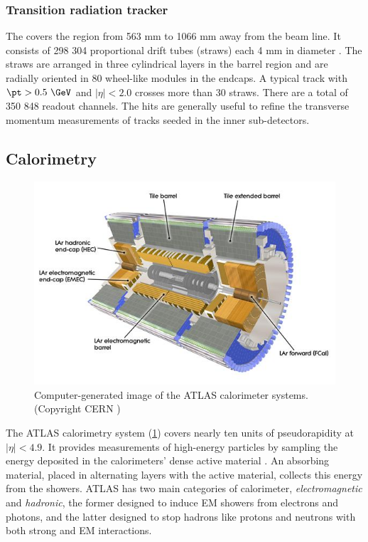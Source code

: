 \subsubsection{Transition radiation tracker}

The \trt covers the region from 563 mm to 1066 mm away from the beam line.
It consists of 298 304 proportional drift tubes (straws) each 4 mm in diameter \cite{Abat:2008zza}.
The straws are arranged in three cylindrical layers in the barrel region and are radially oriented in 80 wheel-like modules in the endcaps.
A typical track with $\pt > 0.5~\GeV$ and $|\eta| < 2.0$ crosses more than 30 straws.
There are a total of 350 848 readout channels.
The \trt hits are generally useful to refine the transverse momentum measurements of tracks seeded in the inner sub-detectors.

\subsection{Calorimetry}
\label{sec:atlas:calo}

\begin{figure}[t]
\includegraphics{calorimeter.jpg}
\caption{Computer-generated image of the ATLAS calorimeter systems. (Copyright CERN \cite{Pequenao:1095927})}
\label{fig:atlas_calorimeter}
\end{figure}

The ATLAS calorimetry system (\cref{fig:atlas_calorimeter}) covers nearly ten units of pseudorapidity at $|\eta| < 4.9$.
It provides measurements of high-energy particles by sampling the energy deposited in the calorimeters' dense active material \cite{Airapetian:1996iv}. %
An absorbing material, placed in alternating layers with the active material, collects this energy from the showers.
ATLAS has two main categories of calorimeter, \emph{electromagnetic} and \emph{hadronic}, the former designed to induce \ac{EM} showers from electrons and photons, and the latter designed to stop hadrons like protons and neutrons with both strong and \ac{EM} interactions.

